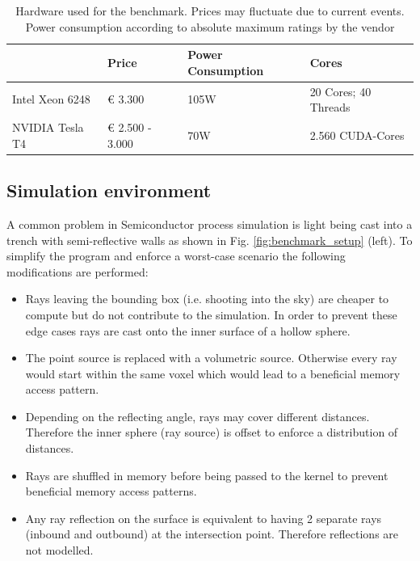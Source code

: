 \begin{table}[H]
\caption{Hardware used for the benchmark. Prices may fluctuate due to current events. Power consumption according to absolute maximum ratings by the vendor}
\label{tab:hardware}
\centering
\begin{tabular}{@{}llll@{}}
	\toprule
	& Price           & Power Consumption & Cores                \\ \hline
Intel Xeon 6248 & € 3.300         & 105W              & 20 Cores; 40 Threads \\
NVIDIA Tesla T4 & € 2.500 - 3.000 & 70W               & 2.560 CUDA-Cores     \\ \bottomrule
\end{tabular}
\end{table}

\subsection{Simulation environment}

A common problem in Semiconductor process simulation is light being cast into a trench with semi-reflective walls as shown in Fig. \ref{fig:benchmark_setup} (left).
To simplify the program and enforce a worst-case scenario the following modifications are performed:

\begin{itemize}
	\item Rays leaving the bounding box (i.e. shooting into the sky) are cheaper to compute but do not contribute to the simulation. 
	In order to prevent these edge cases rays are cast onto the inner surface of a hollow sphere.
	\item The point source is replaced with a volumetric source. Otherwise every ray would start within the same voxel which would lead to a beneficial memory access pattern.
	\item Depending on the reflecting angle, rays may cover different distances. Therefore the inner sphere (ray source) is offset to enforce a distribution of distances.
	\item Rays are shuffled in memory before being passed to the kernel to prevent beneficial memory access patterns.
	\item Any ray reflection on the surface is equivalent to having 2 separate rays (inbound and outbound) at the intersection point. Therefore reflections are not modelled.
\end{itemize}


